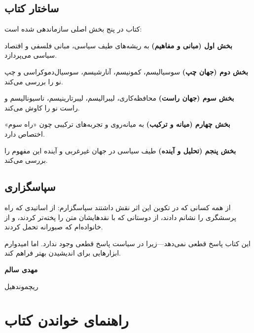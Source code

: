 \section*{ساختار کتاب}

\vspace{-10pt}

کتاب در پنج بخش اصلی سازماندهی شده است:

\textbf{بخش اول (مبانی و مفاهیم)} به ریشه‌های طیف سیاسی، مبانی فلسفی و اقتصاد سیاسی می‌پردازد.

\textbf{بخش دوم (جهان چپ)} سوسیالیسم، کمونیسم، آنارشیسم، سوسیال‌دموکراسی و چپ نو را بررسی می‌کند.

\textbf{بخش سوم (جهان راست)} محافظه‌کاری، لیبرالیسم، لیبرتارینیسم، ناسیونالیسم و راست نو را کاوش می‌کند.

\textbf{بخش چهارم (میانه و ترکیب)} به میانه‌روی و تجربه‌های ترکیبی چون «راه سوم» اختصاص دارد.

\textbf{بخش پنجم (تحلیل و آینده)} طیف سیاسی در جهان غیرغربی و آینده این مفهوم را بررسی می‌کند.

\section*{سپاسگزاری}

از همه کسانی که در تکوین این اثر نقش داشتند سپاسگزارم: از اساتیدی که راه پرسشگری را نشانم دادند، از دوستانی که با نقدهایشان متن را پخته‌تر کردند، و از خانواده‌ام که صبورانه تحمل کردند.

\vspace{10pt}

این کتاب پاسخ قطعی نمی‌دهد—زیرا در سیاست پاسخ قطعی وجود ندارد. اما امیدوارم ابزارهایی برای اندیشیدن بهتر فراهم کند.

\vspace{10pt}

\begin{flushright}

\textbf{مهدی سالم}

ریچموندهیل
\end{flushright}

\newpage


\chapter*{راهنمای خواندن کتاب}

